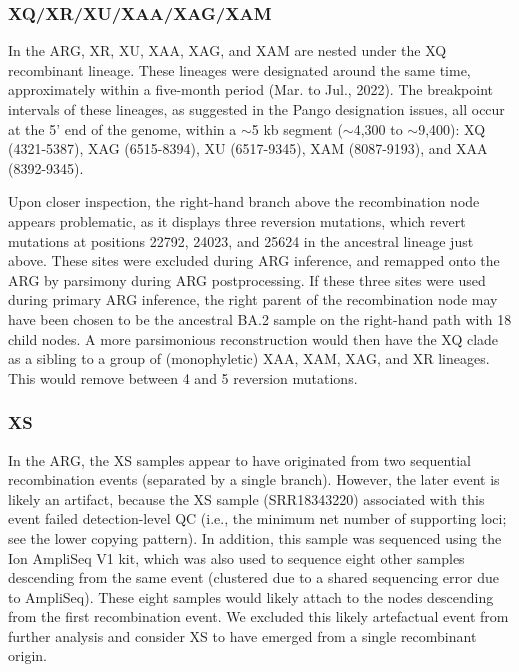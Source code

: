 \documentclass[12pt]{article}
\begin{document}

\subsubsection{XQ/XR/XU/XAA/XAG/XAM}
\label{sec:dd_xq}

In the ARG, XR, XU, XAA, XAG, and XAM
are nested under the XQ recombinant lineage.
These lineages were designated around the same time,
approximately within a five-month period (Mar. to Jul., 2022).
The breakpoint intervals of these lineages,
as suggested in the Pango designation issues,
all occur at the 5' end of the genome,
within a $\sim$5 kb segment ($\sim$4,300 to $\sim$9,400):
XQ (4321-5387), %
XAG (6515-8394), %
XU (6517-9345), %
XAM (8087-9193), %
and XAA (8392-9345). %

Upon closer inspection,
the right-hand branch above the recombination node appears problematic,
as it displays three reversion mutations,
which revert mutations at positions 22792, 24023, and 25624
in the ancestral lineage just above.
These sites were excluded during ARG inference, and
remapped onto the ARG by parsimony during ARG postprocessing.
If these three sites were used during primary ARG inference,
the right parent of the recombination node
may have been chosen to be the ancestral BA.2 sample
on the right-hand path with 18 child nodes.
A more parsimonious reconstruction
would then have the XQ clade as a sibling to
a group of (monophyletic) XAA, XAM, XAG, and XR lineages.
This would remove between 4 and 5 reversion mutations.



\subsubsection{XS}
\label{sec:dd_xs}

In the ARG, the XS samples appear to have originated from
two sequential recombination events (separated by a single branch).
However, the later event is likely an artifact,
because the XS sample (SRR18343220) associated with
this event failed detection-level QC
(i.e., the minimum net number of supporting loci;
see the lower copying pattern).
In addition, this sample was sequenced using the Ion AmpliSeq V1 kit,
which was also used to sequence eight other samples
descending from the same event
(clustered due to a shared sequencing error due to AmpliSeq).
These eight samples would likely attach to the nodes
descending from the first recombination event.
We excluded this likely artefactual event from further analysis and
consider XS to have emerged from a single recombinant origin.
\end{document}
